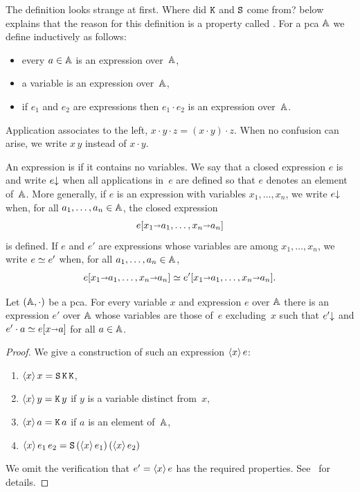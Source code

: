\noindent
The definition looks strange at first. Where did $\combK$ and $\combS$
come from?  below explains
that the reason for this definition is a property called
.
%
For a pca $\AA$ we define  inductively as
follows:
%
\begin{itemize}
\item every $a \in \AA$ is an expression over~$\AA$,
\item a variable is an expression over~$\AA$,
\item if $e_1$ and $e_2$ are expressions then $e_1 \cdot e_2$ is an
  expression over~$\AA$.
\end{itemize}
%
Application associates to the left, $x \cdot y \cdot z = (x \cdot y) \cdot z$.
When no confusion can arise, we write $x \, y$ instead of $x \cdot y$.

An expression is  if it contains no variables. We say
that a closed expression $e$ is  and write $\defined{e}$
when all applications in~$e$ are defined so that $e$ denotes an
element of~$\AA$. More generally, if $e$ is an expression with variables
$x_1, \ldots, x_n$, we write $\defined{e}$ when, for all $a_1, \ldots,
a_n \in \AA$, the closed expression
%
\begin{equation*}
  \subst{e}{x_1 \subto a_1, \ldots, x_n \subto a_n}
\end{equation*}
%
is defined. If $e$ and $e'$ are expressions whose variables are among
$x_1, \ldots, x_n$, we write $e \kleq e'$ when, for all $a_1, \ldots,
a_n \in \AA$,
%
\begin{equation*}
  \subst{e}{x_1 \subto a_1, \ldots, x_n \subto a_n} \kleq
  \subst{e'}{x_1 \subto a_1, \ldots, x_n \subto a_n}.
\end{equation*}

\begin{theorem}
  \label{th:combinatory-completeness}
  Let $(\AA, {\cdot})$ be a pca. For every variable $x$ and expression
  $e$ over $\AA$ there is an expression $e'$ over $\AA$ whose variables
  are those of~$e$ excluding~$x$ such that $\defined{e'}$ and $e'
  \cdot a \kleq \subst{e}{x \subto a}$ for all $a \in \AA$.
\end{theorem}

\begin{proof}
  We give a construction of such an expression $\pcalam{x} e$:
  \begin{enumerate}
  \item $\pcalam{x} x = \combS\, \combK\, \combK$,
  \item $\pcalam{x} y = \combK\, y$ if $y$ is a variable distinct from~$x$,
  \item $\pcalam{x} a = \combK\, a$ if $a$ is an element of~$\AA$,
  \item $\pcalam{x}{e_1\, e_2} = \combS\, (\pcalam{x} e_1)\, (\pcalam{x} e_2)$
  \end{enumerate}
  We omit the verification that $e' = \pcalam{x} e$ has the required
  properties. See~ for details.
\end{proof}

